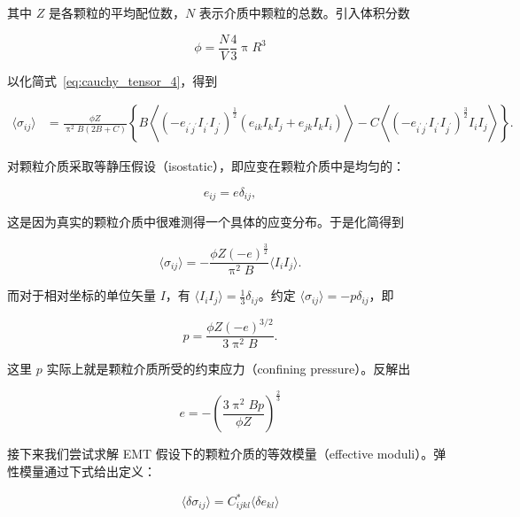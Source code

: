 其中 $Z$ 是各颗粒的平均配位数，$N$ 表示介质中颗粒的总数。引入体积分数

\begin{equation}
  \phi = \frac{N}{V}\frac{4}{3}\uppi R^3
\end{equation}

以化简式~\eqref{eq:cauchy_tensor_4}，得到

\begin{equation}
  \begin{aligned}
    \langle\sigma_{ij}\rangle &= \frac{\phi Z}{\uppi^{2}B(2B+C)}\left\{B\left\langle(-e_{i^{\prime}j^{\prime}}I_{i^{\prime}}I_{j^{\prime}})^{\frac{1}{2}}(e_{ik}I_{k}I_{j} + e_{jk}I_{k}I_{i})\right\rangle - C\left\langle(-e_{i^{\prime}j^{\prime}}I_{i^{\prime}}I_{j^{\prime}})^{\frac{3}{2}}I_{i}I_{j}\right\rangle\right\}.
  \end{aligned}\label{eq:cauchy_tensor_end}
\end{equation}

对颗粒介质采取等静压假设（isostatic），即应变在颗粒介质中是均匀的：

\begin{equation}
  e_{ij} = e\delta_{ij},
\end{equation}

这是因为真实的颗粒介质中很难测得一个具体的应变分布。于是化简得到

\begin{equation}
  \langle\sigma_{ij}\rangle = -\frac{\phi Z(-e)^{\frac{3}{2}}}{\uppi^{2}B}\langle I_{i}I_{j}\rangle.\label{eq:expected_value}
\end{equation}

而对于相对坐标的单位矢量 $I$，有 $\langle I_{i}I_{j}\rangle = \frac{1}{3}\delta_{ij}$。约定 $\langle\sigma_{ij}\rangle = -p\delta_{ij}$，即

\begin{equation}
  p = \frac{\phi Z(-e)^{3/2}}{3\uppi^{2}B}.
\end{equation}

这里 $p$ 实际上就是颗粒介质所受的约束应力（confining pressure）。反解出

\begin{equation}
  e = -\left(\frac{3\uppi^{2}Bp}{\phi Z}\right)^{\frac{2}{3}}
\end{equation}

接下来我们尝试求解 EMT 假设下的颗粒介质的等效模量（effective moduli）。弹性模量通过下式给出定义：

\begin{equation}
  \langle\delta\sigma_{ij}\rangle = C_{ijkl}^{*}\langle\delta e_{kl}\rangle\label{eq:modulus_definition}
\end{equation}


